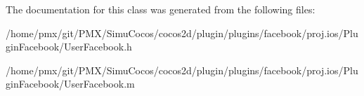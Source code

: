 The documentation for this class was generated from the following files\+:\begin{DoxyCompactItemize}
\item 
/home/pmx/git/\+P\+M\+X/\+Simu\+Cocos/cocos2d/plugin/plugins/facebook/proj.\+ios/\+Plugin\+Facebook/User\+Facebook.\+h\item 
/home/pmx/git/\+P\+M\+X/\+Simu\+Cocos/cocos2d/plugin/plugins/facebook/proj.\+ios/\+Plugin\+Facebook/User\+Facebook.\+m\end{DoxyCompactItemize}
